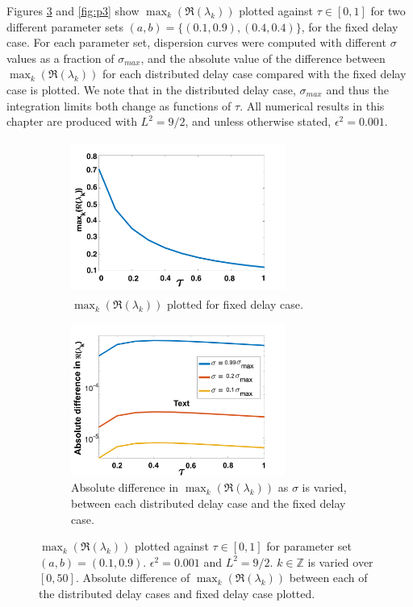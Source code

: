 Figures \ref{fig:p2} and \ref{fig:p3} show $\max_k(\Re(\lambda_k))$ plotted against $\tau\in[0,1]$ for two different parameter sets $(a,b)=\{(0.1,0.9), (0.4,0.4)\}$, for the fixed delay case. For each parameter set, dispersion curves were computed with different $\sigma$ values as a fraction of $\sigma_{max}$, and the absolute value of the difference between $\max_k(\Re(\lambda_k))$ for each distributed delay case compared with the fixed delay case is plotted. We note that in the distributed delay case,  $\sigma_{max}$ and thus the integration limits both change as functions of $\tau$. All numerical results in this chapter are produced with $L^2=9/2$, and unless otherwise stated, $\epsilon^2=0.001$.

\begin{figure}[H]
    \centering
    \begin{subfigure}[t]{0.45\textwidth}
        \centering
        \includegraphics[width=7cm,height=5cm]{p2fixed.png}
        \caption{$\max_k(\Re(\lambda_k))$ plotted for fixed delay case.}
        \label{}
    \end{subfigure}
    \hfill
    \begin{subfigure}[t]{0.45\textwidth}
        \centering
        \includegraphics[width=7cm,height=5cm]{dispdiff1.png}
        \caption{Absolute difference in $\max_k(\Re(\lambda_k))$ as $\sigma$ is varied, between each distributed delay case and the fixed delay case.}
        \label{}
    \end{subfigure}
    \caption{$\max_k(\Re(\lambda_k))$ plotted against $\tau\in[0,1]$ for parameter set $(a,b)=(0.1,0.9)$. $\epsilon^2=0.001$ and $L^2=9/2$. $k\in\mathbb{Z}$ is varied over $[0,50]$. Absolute difference of $\max_k(\Re(\lambda_k))$ between each of the distributed delay cases and fixed delay case plotted.}
    \label{fig:p2}
\end{figure}

